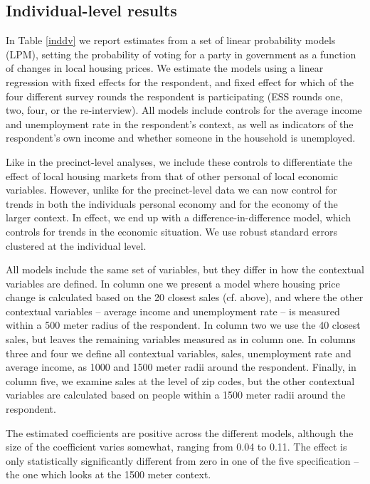 \documentclass[12pt,a4paper]{article}
\begin{document}
	\subsection{Individual-level results}
	
	In Table \ref{inddv} we report estimates from a set of linear probability models (LPM), setting the probability of voting for a party in government as a function of changes in local housing prices. We estimate the models using a linear regression with fixed effects for the respondent, and fixed effect for which of the four different survey rounds the respondent is participating (ESS rounds one, two, four, or the re-interview). All models include controls for the average income and unemployment rate in the respondent's context, as well as indicators of the respondent's own income and whether someone in the household is unemployed. 
	
		
	
	Like in the precinct-level analyses, we include these controls to differentiate the effect of local housing markets from that of other personal of local economic variables. However, unlike for the precinct-level data we can now control for trends in both the individuals personal economy and for the economy of the larger context. In effect, we end up with a difference-in-difference model, which controls for trends in the economic situation. We use robust standard errors clustered at the individual level.
	
	All models include the same set of variables, but they differ in how the contextual variables are defined. In column one we present a model where housing price change is calculated based on the 20 closest sales (cf. above), and where the other contextual variables -- average income and unemployment rate -- is measured within a 500 meter radius of the respondent. In column two we use the 40 closest sales, but leaves the remaining variables measured as in column one. In columns three and four we define all contextual variables, sales, unemployment rate and average income, as 1000 and 1500 meter radii around the respondent. Finally, in column five, we examine sales at the level of zip codes, but the other contextual variables are calculated based on people within a 1500 meter radii around the respondent.
	
	The estimated coefficients are positive across the different models, although the size of the coefficient varies somewhat, ranging from 0.04 to 0.11. The effect is only statistically significantly different from zero in one of the five specification -- the one which looks at the 1500 meter context.
	
\end{document}
